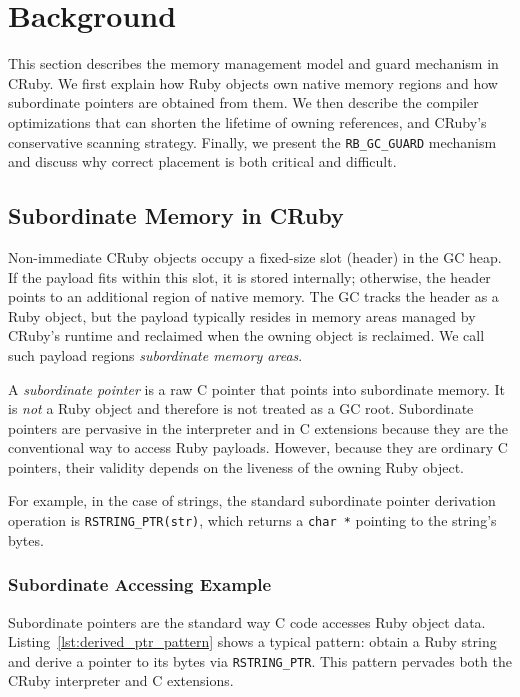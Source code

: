 \section{Background}\label{sec:Background}

This section describes the memory management model and guard mechanism in CRuby. We first explain how Ruby objects own native memory regions and how subordinate pointers are obtained from them. We then describe the compiler optimizations that can shorten the lifetime of owning references, and CRuby's conservative scanning strategy. Finally, we present the \texttt{RB\_GC\_GUARD} mechanism and discuss why correct placement is both critical and difficult.

\subsection{Subordinate Memory in CRuby}
Non-immediate CRuby objects occupy a fixed-size slot (header) in the GC heap. If the payload fits within this slot, it is stored internally; otherwise, the header points to an additional region of native memory.  The GC tracks the header as a Ruby object, but the payload typically resides in memory areas managed by CRuby's runtime and reclaimed when the owning object is reclaimed.  We call such payload regions \emph{subordinate memory areas}.

A \emph{subordinate pointer} is a raw C pointer that points into subordinate memory.  It is \emph{not} a Ruby object and therefore is not treated as a GC root.  Subordinate pointers are pervasive in the interpreter and in C extensions because they are the conventional way to access Ruby payloads. However, because they are ordinary C pointers, their validity depends on the liveness of the owning Ruby object.

For example, in the case of strings, the standard subordinate pointer derivation operation is \texttt{RSTRING\_PTR(str)},
which returns a \texttt{char *} pointing to the string's bytes.  

\subsubsection*{Subordinate Accessing Example}
Subordinate pointers are the standard way C code accesses Ruby object data.  Listing~\ref{lst:derived_ptr_pattern} shows a typical pattern: obtain a Ruby string and derive a pointer to its bytes via \texttt{RSTRING\_PTR}.  This pattern pervades both the CRuby interpreter and C extensions.

